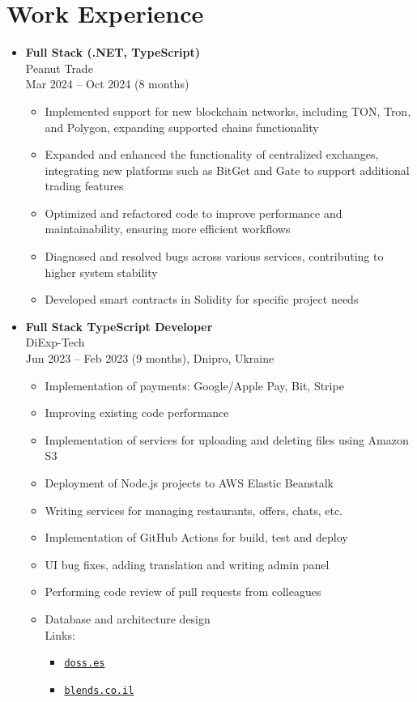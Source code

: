 \section{Work Experience}\label{sec:work-experience}
\begin{itemize}[noitemsep]
    \item \textbf{Full Stack (.NET, TypeScript)} \\
    Peanut Trade \\
    Mar 2024 -- Oct 2024 \; (8 months)
    \begin{itemize}[noitemsep]
        \item Implemented support for new blockchain networks, including TON, Tron, and Polygon, expanding supported chains functionality
        \item Expanded and enhanced the functionality of centralized exchanges, integrating new platforms such as BitGet and Gate to support additional trading features
        \item Optimized and refactored code to improve performance and maintainability, ensuring more efficient workflows
        \item Diagnosed and resolved bugs across various services, contributing to higher system stability
        \item Developed smart contracts in Solidity for specific project needs
    \end{itemize}

    \item \textbf{Full Stack TypeScript Developer} \\
    DiExp-Tech \\
        Jun 2023 -- Feb 2023 \; (9 months), \bskip Dnipro, \bskip Ukraine
    \begin{itemize}[noitemsep]
        \item Implementation of payments: Google/Apple Pay, Bit, Stripe
        \item Improving existing code performance
        \item Implementation of services for uploading and deleting files using Amazon S3
        \item Deployment of Node.js projects to AWS Elastic Beanstalk
        \item Writing services for managing restaurants, offers, chats, etc.
        \item Implementation of GitHub Actions for build, test and deploy
        \item UI bug fixes, adding translation and writing admin panel
        \item Performing code review of pull requests from colleagues
        \item Database and architecture design
        \\ {Links}:
        \begin{itemize}[noitemsep]
            \item \href{https://www.doss.es}{\verb"doss.es"}
            \item \href{https://blends.co.il}{\verb"blends.co.il"}
        \end{itemize}
    \end{itemize}


\end{itemize}
